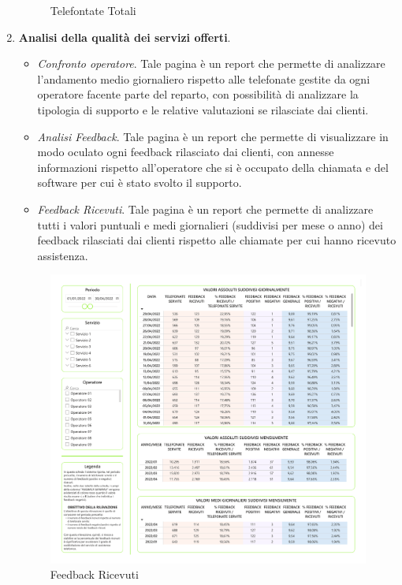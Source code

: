 \begin{enumerate}
\begin{figure}[H]
    \caption{Telefontate Totali}
    \label{fig:BI Call Report-1}
    \end{figure}
    \item \textbf{Analisi della qualità dei servizi offerti}.
        \begin{itemize}
            \item \textit{Confronto operatore}. Tale pagina è un report che permette di analizzare l'andamento medio giornaliero rispetto alle telefonate gestite da ogni operatore facente parte del reparto, con possibilità di analizzare la tipologia di supporto e le relative valutazioni se rilasciate dai clienti.
            \item \textit{Analisi Feedback}. Tale pagina è un report che permette di visualizzare in modo oculato ogni feedback rilasciato dai clienti, con annesse informazioni rispetto all'operatore che si è occupato della chiamata e del software per cui è stato svolto il supporto.
            \item \textit{Feedback Ricevuti}. Tale pagina è un report che permette di analizzare tutti i valori puntuali e medi giornalieri (suddivisi per mese o anno) dei feedback rilasciati dai clienti rispetto alle chiamate per cui hanno ricevuto assistenza.
        \end{itemize}
        \begin{figure}[H]
        \centering
        \includegraphics[height=0.8\linewidth]{figure/capitolo_4/BI Call Report-2.pdf}
        \caption{Feedback Ricevuti}
        \label{fig:BI Call Report-2}
        \end{figure}

\end{enumerate}
